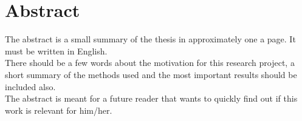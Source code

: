 \chapter*{Abstract}
The abstract is a small summary of the thesis in approximately one a page. It must be written in English.\\
There should be a few words about the motivation for this research project, a short summary of the methods used and the most important results should be included also.\\
The abstract is meant for a future reader that wants to quickly find out if this work is relevant for him/her.\\

